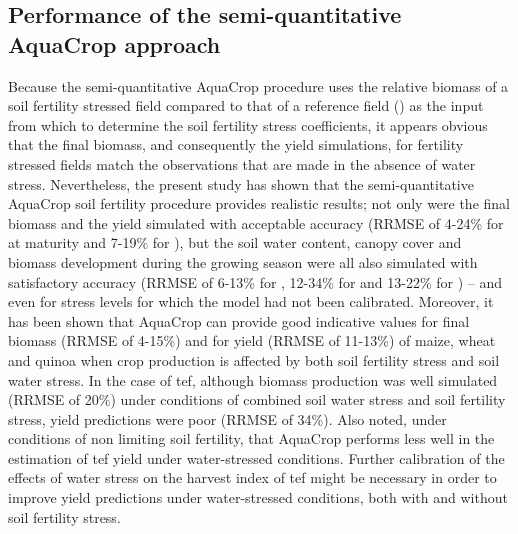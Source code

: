 \subsection{Performance of the semi-quantitative AquaCrop approach}
Because the semi-quantitative AquaCrop procedure uses the relative biomass of a soil fertility stressed field compared to that of a reference field (\Brel) as the input from which to determine the soil fertility stress coefficients, it appears obvious that the final biomass, and consequently the yield simulations, for fertility stressed fields match the observations that are made in the absence of water stress. Nevertheless, the present study has shown that the semi-quantitative AquaCrop soil fertility procedure provides realistic results; not only were the final biomass and the yield simulated with acceptable accuracy (RRMSE of 4-24\% for \B at maturity and 7-19\% for \Y), but the soil water content, canopy cover and biomass development during the growing season were all also simulated with satisfactory accuracy (RRMSE of 6-13\% for \SWCr, 12-34\% for \CC and 13-22\% for \B) – and even for stress levels for which the model had not been calibrated. Moreover, it has been shown that AquaCrop can provide good indicative values for final biomass (RRMSE of 4-15\%) and for yield (RRMSE of 11-13\%) of maize, wheat and quinoa when crop production is affected by both soil fertility stress and soil water stress. In the case of tef, although biomass production was well simulated (RRMSE of 20\%) under conditions of combined soil water stress and soil fertility stress, yield predictions were poor (RRMSE of 34\%). Also \textcite{tsegay2012} noted, under conditions of non limiting soil fertility, that AquaCrop performs less well in the estimation of tef yield under water-stressed conditions. Further calibration of the effects of water stress on the harvest index of tef might be necessary in order to improve yield predictions under water-stressed conditions, both with and without soil fertility stress.


